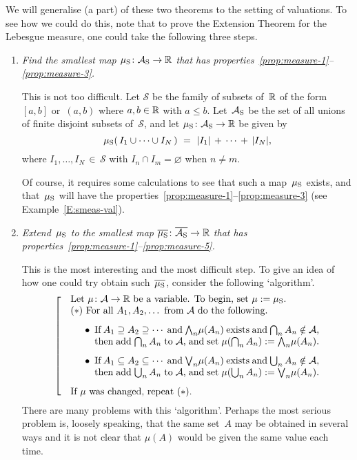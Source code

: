 We will generalise (a part) of these two theorems
to the setting of valuations.
To see how we could do this,
note that to prove
the Extension Theorem for the Lebesgue measure,
one could take the following three steps.
\begin{enumerate}
\item
\label{extension-step-1}
\emph{Find the smallest map $\mu_{\mathrm{S}}\colon \mathcal{A}_{\mathrm{S}}\rightarrow \mathbb{R}$
that has properties~\ref{prop:measure-1}--\ref{prop:measure-3}.}

This is not too difficult.
Let $\mathcal{S}$ be the family of subsets of~$\mathbb{R}$ of
the form~$[a,b]$ or~$(a,b)$ where $a,b\in \mathbb{R}$ with $a\leq b$.
Let~$\mathcal{A}_{\mathrm{S}}$ be the set of all unions
of finite disjoint subsets of~$\mathcal{S}$,
and let $\mu_{\mathrm{S}}\colon \mathcal{A}_{\mathrm{S}}\rightarrow \mathbb{R}$
be given by
\begin{equation*}
\Smu(\,I_1 \cup\dotsb\cup I_N\,) \ = \ |I_1| \,+\,\dotsb\,+\,|I_N|,
\end{equation*}
where $I_1,\dotsc,I_N\,\in\, \mathcal{S}$
with $I_n\cap I_m = \varnothing$ when $n\neq m$.

Of course, it requires some calculations
to see that such a map~$\mu_{\mathrm{S}}$ exists,
and that~$\mu_{\mathrm{S}}$ will have the 
properties~\ref{prop:measure-1}--\ref{prop:measure-3}
(see Example~\ref{E:smeas-val}).

\item
\label{extension-step-2}
\emph{Extend~$\mu_{\mathrm{S}}$
to the smallest map $\overline{\mu_{\mathrm{S}}}\colon\overline{\mathcal{A}_{\mathrm{S}}}\rightarrow\mathbb{R}$
that has properties~\ref{prop:measure-1}--\ref{prop:measure-5}.}

This is the most interesting and the most difficult step.
To give an idea of how one could try obtain such~$\overline{\mu_{\mathrm{S}}}$,
consider the following `algorithm'.
\begin{equation*}
\left[\quad
\begin{minipage}{.75\columnwidth}
Let $\mu\colon\mathcal{A} \ra \R$
be a variable. To begin, set $\mu \eqdf \Smu$.\\
$\mathbf{(*)}$ For all~$A_1,A_2,\dotsc$ from~$\mathcal{A}$ 
do the following.
\begin{enumerate}
\item[$\bullet$] If $A_1 \supseteq A_2 \supseteq \dotsb$
and  $\bw_n \mu(A_n)$ exists
and  $\bigcap_n A_n \notin \mathcal{A}$,\\
then add $\bigcap_n A_n$ to~$\mathcal{A}$,
and set $\mu(\bigcap_n A_n) \eqdf \bw_n \mu(A_n)$.
\item[$\bullet$] If $A_1 \subseteq A_2 \subseteq \dotsb$
and  $\bv_n \mu(A_n)$ exists
and  $\bigcup_n A_n \notin \mathcal{A}$,\\
then add $\bigcup_n A_n$ to~$\mathcal{A}$,
and set $\mu(\bigcup_n A_n) \eqdf \bv_n \mu(A_n)$.
\end{enumerate}
If~$\mu$ was changed, repeat~$\mathbf{(*)}$.
\end{minipage}
\right.
\end{equation*}
There are many problems with this `algorithm'.
Perhaps the most serious problem
is, loosely speaking, that the same set~$A$ may be obtained
in several ways
and it is not clear that
$\mu(A)$ would be given the same value each time.


\end{enumerate}
